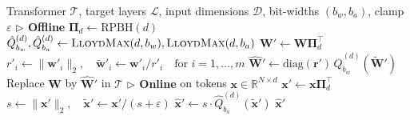 \begin{algorithm}[t]
\caption{OrbitQuant offline weight patching and online activation quantization}
\label{alg:OrbitQuant}
\small
\begin{algorithmic}[1]
\REQUIRE Transformer $\mathcal{T}$, target layers $\mathcal{L}$, input dimensions $\mathcal{D}$, bit-widths $(b_w, b_a)$, clamp $\varepsilon$
\STATE \textbf{$\triangleright$ Offline}
  \STATE $\boldsymbol{\Pi}_d \gets \mathrm{RPBH}(d)$
  \STATE $\hat{Q}_{b_w}^{(d)}, \hat{Q}_{b_a}^{(d)} \gets \textsc{LloydMax}(d, b_w), \textsc{LloydMax}(d, b_a)$
\ENDFOR
{}
  \STATE $\mathbf{W}' \gets \mathbf{W}\boldsymbol{\Pi}_d^\top$
  \STATE $r'_i \gets \|\mathbf{w}'_i\|_2, \quad \tilde{\mathbf{w}}'_i \gets \mathbf{w}'_i / r'_i \quad \text{for } i = 1, \dots, m$
  \STATE $\hat{\mathbf{W}}' \gets \mathrm{diag}(\mathbf{r}')\,\hat{Q}_{b_w}^{(d)}(\tilde{\mathbf{W}}')$
  \STATE Replace $\mathbf{W}$ by $\hat{\mathbf{W}}'$ in $\mathcal{T}$
\ENDFOR
\medskip
\STATE \textbf{$\triangleright$ Online} on tokens $\mathbf{x} \in \mathbb{R}^{N \times d}$
\STATE $\mathbf{x}' \gets \mathbf{x}\boldsymbol{\Pi}_d^\top$ 
\STATE $s \gets \|\mathbf{x}'\|_2, \quad \tilde{\mathbf{x}}' \gets \mathbf{x}' / (s + \varepsilon)$
\STATE $\hat{\mathbf{x}}' \gets s \cdot \hat{Q}_{b_a}^{(d)}(\tilde{\mathbf{x}}')$
\RETURN $\hat{\mathbf{x}}'$
\end{algorithmic}
\end{algorithm}


